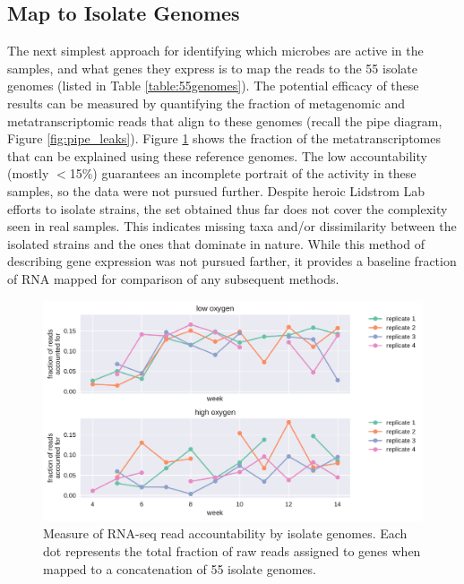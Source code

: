 \subsection{Map to Isolate Genomes}

The next simplest approach for identifying which microbes are active in the samples, and what genes they express is to map the reads to the 55 isolate genomes (listed in Table \ref{table:55genomes}).
The potential efficacy of these results can be measured by quantifying the fraction of metagenomic and metatranscriptomic reads that align to these genomes (recall the pipe diagram, Figure \ref{fig:pipe_leaks}).
Figure \ref{fig:isolate_RNAseq} shows the fraction of the metatranscriptomes that can be explained using these reference genomes.
The low accountability (mostly $<$15\%) guarantees an incomplete portrait of the activity in these samples, so the data were not pursued further.
Despite heroic Lidstrom Lab efforts to isolate strains, the set obtained thus far does not cover the complexity seen in real samples.
This indicates missing taxa and/or dissimilarity between the isolated strains and the ones that dominate in nature.
While this method of describing gene expression was not pursued farther, it provides a baseline fraction of RNA mapped for comparison of any subsequent methods.


\begin{figure}[H]
\centering
    \includegraphics[width=1.0\textwidth]{./tex/chapter2/figures/170208_fraction_of_transcriptome_reads_mapped_to_isolates.pdf}
    \begin{singlespace}
    \caption[Measure of RNA-seq read accountability by isolate genomes]{
        Measure of RNA-seq read accountability by isolate genomes.
        Each dot represents the total fraction of raw reads assigned to genes when mapped to a concatenation of 55 isolate genomes.
        }
    \label{fig:isolate_RNAseq}
    \end{singlespace}
\end{figure}


